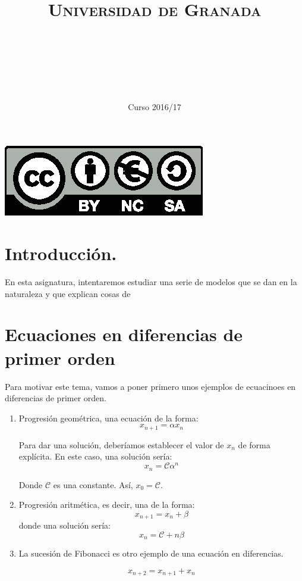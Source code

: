 \documentclass[11pt, a4paper, titlepage]{article}
\title{
  \normalfont \normalsize 
  \textsc{Universidad de Granada} \\ [25pt]    %
  \horrule{0.5pt} \\[0.4cm] %
  \huge \subject\\ %
  \horrule{2pt} \\[0.5cm] %
}
\author{\Large{\docauthor}}
\date{\vspace{-1.5em} \normalsize Curso 2016/17}
\theoremstyle{theorem-style}
\theoremstyle{definition-style}
\theoremstyle{remark-style}
\theoremstyle{example-style}
\begin{document}
\maketitle  %
\tableofcontents    %
\vfill
\begin{center}
\includegraphics{../Recursos/Plantillas/by-nc-sa.eps}  %
\end{center}
\newpage


\section*{Introducción.}
En esta asignatura, intentaremos estudiar una serie de modelos que se dan en la naturaleza y que explican cosas de 




\newpage

\section{Ecuaciones en diferencias de primer orden}

Para motivar este tema, vamos a poner primero unos ejemplos de ecuacinoes en diferencias de primer orden.

\begin{enumerate}
	\item Progresión geométrica, una ecuación de la forma:
\[
x_{n+1} =  \alpha x_n
\]

Para dar una solución, deberíamos establecer el valor de $x_n$ de forma explícita. En este caso, una solución sería:
\[
x_n = \mathcal{C} \alpha^n
\]

Donde $\mathcal{C}$ es una constante. Así, $x_0 = \mathcal{C}$.

\item Progresión aritmética, es decir, una de la forma:
\[
x_{n+1} = x_n + \beta
\]
donde una solución sería:
\[
x_n = \mathcal{C} + n\beta
\]

\item La sucesión de Fibonacci es otro ejemplo de una ecuación en diferencias.

\[
x_{n+2} = x_{n+1} + x_{n}
\]

\end{enumerate}
\end{document}
